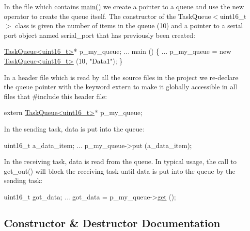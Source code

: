 In the file which contains {\ttfamily \mbox{\hyperlink{main_8cpp_a840291bc02cba5474a4cb46a9b9566fe}{main()}}} we create a pointer to a queue and use the {\ttfamily new} operator to create the queue itself. The constructor of the {\ttfamily Task\+Queue$<$uint16\+\_\+t$>$} class is given the number of items in the queue (10) and a pointer to a serial port object named {\ttfamily serial\+\_\+port} that has previously been created\+: 
\begin{DoxyCode}
\mbox{\hyperlink{class_task_queue}{TaskQueue<uint16\_t>}}* p\_my\_queue;
...
main ()
\{
    ...
    p\_my\_queue = \textcolor{keyword}{new} \mbox{\hyperlink{class_task_queue}{TaskQueue<uint16\_t>}} (10, \textcolor{stringliteral}{"Data1"});
\}
\end{DoxyCode}
 In a header file which is read by all the source files in the project we re-\/declare the queue pointer with the keyword {\ttfamily extern} to make it globally accessible in all files that {\ttfamily \#include} this header file\+: 
\begin{DoxyCode}
\textcolor{keyword}{extern} \mbox{\hyperlink{class_task_queue}{TaskQueue<uint16\_t>}}* p\_my\_queue;
\end{DoxyCode}
 In the sending task, data is put into the queue\+: 
\begin{DoxyCode}
uint16\_t a\_data\_item;
...
p\_my\_queue->put (a\_data\_item);
\end{DoxyCode}
 In the receiving task, data is read from the queue. In typical usage, the call to {\ttfamily get\+\_\+out()} will block the receiving task until data is put into the queue by the sending task\+: 
\begin{DoxyCode}
uint16\_t got\_data;
...
got\_data = p\_my\_queue->\mbox{\hyperlink{class_task_queue_a8b696b7e87f4e1bb5cfde83f91dcef75}{get}} ();
\end{DoxyCode}
 

\subsection{Constructor \& Destructor Documentation}
\mbox{\label{class_task_queue_a6eb3342ef8f6413673f1d718c1402385}} 
